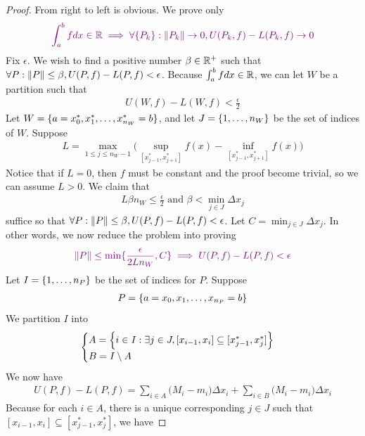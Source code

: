 \documentclass{report}
\begin{document}
\begin{proof}
From right to left is obvious. We prove only 
\begin{align*}
  \textcolor{violet}{\int_a^b fdx\in\mathbb{R} \implies   \forall \{ P_k \} : \| P_k \|\to 0, U(P_k,f)-L(P_k,f)\to 0}
\end{align*}
Fix $\epsilon $. We wish to find a positive number $\beta \in\mathbb{R}^+$ such that $\forall P: \| P \|\leq \beta , U(P,f)-L(P,f)<\epsilon $. Because $\int_a^b fdx \in\mathbb{R}$, we can let $W$ be a partition such that 
\begin{align*}
U(W,f)-L(W,f)<\frac{\epsilon}{2}
\end{align*}
Let $W=\{ a=x_0^*,x_1^*,\dots ,x_{n_W}^*=b \}$, and let $J=\{ 1,\dots ,n_W \}$ be the set of indices of $W$. Suppose
\begin{align}
\label{e1}
L= \max_{1\leq j\leq n_W-1} \big(\sup_{[x_{j-1}^*,x_{j+1}^*]} f(x)- \inf_{[x_{j-1}^*,x_{j+1}^*]} f(x) \big)
\end{align}
Notice that if $L=0$, then  $f$ must be constant and the proof become trivial, so we can assume $L>0$. We claim that 
\begin{align*}
L\beta n_W\leq \frac{\epsilon}{2}\text{ and }\beta < \min_{j \in J}\Delta x_j
\end{align*}
suffice so that $\forall P:\| P \|\leq \beta , U(P,f)-L(P,f)<\epsilon $. Let $C= \min_{j \in J}\Delta x_j$. In other words, we now reduce the problem into proving 
\begin{align*}
  \textcolor{violet}{ \| P \| \leq \min \{ \frac{\epsilon }{2Ln_W },C \} \implies U(P,f)-L(P,f)<\epsilon }
\end{align*}
Let $I=\{ 1,\dots , n_P \}$ be the set of indices for $P$. Suppose 
\begin{align*}
P=\{ a=x_0,x_1,\dots ,x_{n_P}=b \}
\end{align*}
We partition $I$ into 
\begin{align*}
\begin{cases}
  A=\Big\{ i \in I : \exists j \in J,  [x_{i-1},x_i]\subseteq [x_{j-1}^*,x_j^*] \Big\}\\
  B=I \setminus  A
\end{cases}
\end{align*}
We now have 
\begin{align}
\label{e2}
U(P,f)-L(P,f)= \sum_{i \in A} \big(M_i-m_i \big) \Delta x_i +\sum_{i \in B} \big(M_i-m_i \big)\Delta x_i
\end{align}
Because for each $i\in A$, there is a unique corresponding $j \in J$ such that $[x_{i-1},x_i] \subseteq [x_{j-1}^*,x_j^*]$, we have 

\end{proof}
\end{document}
